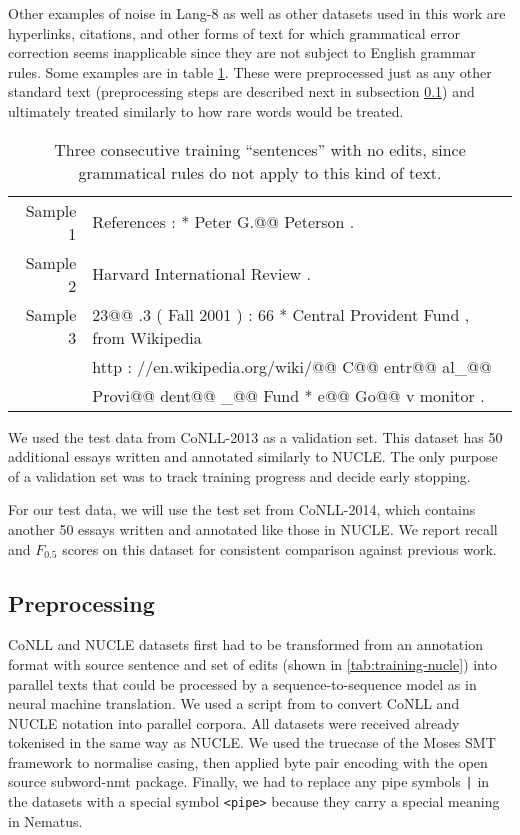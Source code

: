 Other examples of noise in Lang-8 as well as other datasets used in this work are hyperlinks, citations, and other forms of text for which grammatical error correction seems inapplicable since they are not subject to English grammar rules. Some examples are in table \ref{tab:training-citations-hyperlinks}. These were preprocessed just as any other standard text (preprocessing steps are described next in subsection \ref{subsec:preprocessing}) and ultimately treated similarly to how rare words would be treated.
\begin{table}[h]
\centering
\begin{tabular}{ r l }
\tabularnewline \hline \hline
Sample 1 & References : * Peter G.@@ Peterson . \\
Sample 2 & Harvard International Review . \\
Sample 3 & 23@@ .3 ( Fall 2001 ) : 66 * Central Provident Fund , from Wikipedia \\
& http : //en.wikipedia.org/wiki/@@ C@@ entr@@ al\_@@ \\
& Provi@@ dent@@ \_@@ Fund * e@@ Go@@ v monitor . \\
\hline
\end{tabular}
\caption{Three consecutive training ``sentences'' with no edits, since grammatical rules do not apply to this kind of text.} \label{tab:training-citations-hyperlinks}
\end{table}

We used the test data from CoNLL-2013 as a validation set. This dataset has 50 additional essays written and annotated similarly to NUCLE. The only purpose of a validation set was to track training progress and decide early stopping.

For our test data, we will use the test set from CoNLL-2014, which contains another 50 essays written and annotated like those in NUCLE. We report recall and $F_{0.5}$ scores on this dataset for consistent comparison against previous work.

\subsection{Preprocessing} \label{subsec:preprocessing}
CoNLL and NUCLE datasets first had to be transformed from an annotation format with source sentence and set of edits (shown in \ref{tab:training-nucle}) into parallel texts that could be processed by a sequence-to-sequence model as in neural machine translation. We used a script from \citet{Junczys-Dowmunt2016Phrase-basedCorrection} to convert CoNLL and NUCLE notation into parallel corpora. All datasets were received already tokenised in the same way as NUCLE. We used the truecase of the Moses SMT framework \citep{Koehn2007Moses} to normalise casing, then applied byte pair encoding with the open source subword-nmt package. Finally, we had to replace any pipe symbols \texttt{|} in the datasets with a special symbol \texttt{<pipe>} because they carry a special meaning in Nematus.

